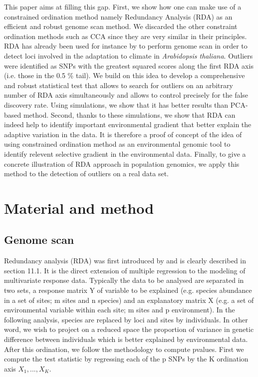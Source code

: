 \documentclass[nogrid]{MBE}%
\begin{document}
	This paper aims at filling this gap. First, we show how one can make use of a constrained ordination method namely Redundancy Analysis (RDA) as an efficient and robust genome scan method. We discarded the other constraint ordination methods such as CCA since they are very similar in their principles. RDA has already been used for instance by \citet{Lasky2012} to perform genome scan in order to detect loci involved in the adaptation to climate in \textit{Arabidopsis thaliana}. Outliers were identified as SNPs with the greatest squared scores along the first RDA axis (i.e. those in the 0.5 \% tail). We build on this idea to develop a comprehensive and robust statistical test that allows to search for outliers on an arbitrary number of RDA axis simultaneously and allows to control precisely for the false discovery rate. Using simulations, we show that it has better results than PCA-based method. Second, thanks to these simulations, we show that RDA can indeed help to identify important environmental gradient that better explain the adaptive variation in the data. It is therefore a proof of concept of the idea of using constrained ordination method as an environmental genomic tool to identify relevent selective gradient in the environmental data. Finally, to give a concrete illustration of RDA approach in population genomics, we apply this method to the detection of outliers on a real data set.

\section{Material and method}

\subsection{Genome scan}

Redundancy analysis (RDA) was first introduced by \citep{Rao1964} and is clearly described in \citep{Legendre2012} section 11.1. It is the direct extension of multiple regression to the modeling of multivariate response data. Typically the data to be analysed are separated in two sets, a response matrix Y of variable to be explained (e.g. species abundance in a set of sites; m sites and n species) and an explanatory matrix X (e.g.  a set of environmental variable within each site; m sites and p environment). 
	In the following analysis, species are replaced by loci and sites by individuals. In other word, we wish to project on a reduced space the proportion of variance in genetic difference between individuals which is better explained by environmental data.
	After this ordination, we follow the \citet{Luu2016} methodology to compute pvalues. First we compute the test statistic by regressing each of the p SNPs by the K ordination axis $X_1, ..., X_K$.
\end{document}
